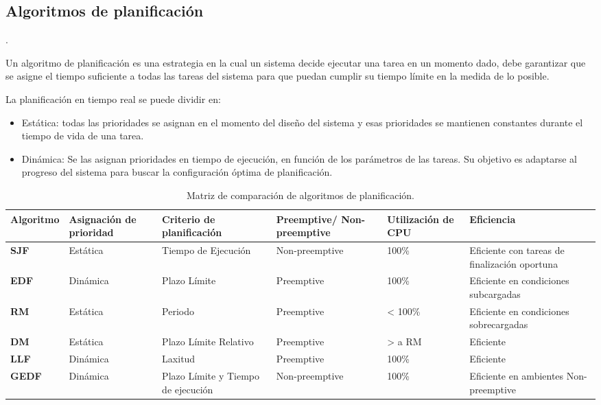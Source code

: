     \subsection{Algoritmos de planificación}\label{sec:AlgoPlan}. 
    
    Un algoritmo de planificación es una estrategia en la cual un sistema decide ejecutar una tarea en un momento dado, debe garantizar que se asigne el tiempo suficiente a todas las tareas del sistema para que puedan cumplir su tiempo límite en la medida de lo posible.
    
    La planificación en tiempo real se puede dividir en:
    \begin{itemize}
    \item Estática:  todas las prioridades se asignan en el momento del diseño del sistema y esas prioridades se mantienen constantes durante el tiempo de vida de una tarea.
    \item Dinámica: Se las asignan prioridades en tiempo de ejecución, en función de los parámetros de las tareas. Su objetivo es adaptarse al progreso del sistema para buscar la configuración óptima de planificación.
    \end{itemize}   

        \begin{table}[h!]
      \begin{center}
            \scriptsize
        \begin{tabular}{|m{1.5cm}|m{2cm}|m{2cm}|m{2cm}|m{2cm}|m{3cm}|}
         \hline
        \cellcolor{lightgray}\textbf{Algoritmo} & \cellcolor{lightgray} \textbf{Asignación de prioridad} & \cellcolor{lightgray} \textbf{Criterio de planificación} & \cellcolor{lightgray} \textbf{Preemptive/ Non-preemptive} & \cellcolor{lightgray} \textbf{Utilización de CPU} & \cellcolor{lightgray} \textbf{Eficiencia}  \\ 
         \hline
          \textbf{SJF} & Estática & Tiempo de Ejecución & Non-preemptive & 100\% & Eficiente con tareas de finalización oportuna \\
         \hline
         \textbf{EDF} & Dinámica & Plazo Límite & Preemptive & 100\% & Eficiente en condiciones subcargadas \\
         \hline 
         \textbf{RM} & Estática & Periodo & Preemptive & < 100\% & Eficiente en condiciones sobrecargadas \\
         \hline
          \textbf{DM} & Estática & Plazo Límite Relativo & Preemptive & > a RM & Eficiente \\
         \hline
          \textbf{LLF} & Dinámica & Laxitud & Preemptive & 100\% & Eficiente \\
         \hline
          \textbf{GEDF} & Dinámica & Plazo Límite y Tiempo de ejecución & Non-preemptive & 100\%& Eficiente en ambientes Non-preemptive \\
         \hline
                \end{tabular}
        \caption{Matriz de comparación de algoritmos de planificación.}
        \label{tab:table2}
      \end{center}
    \end{table}
    
